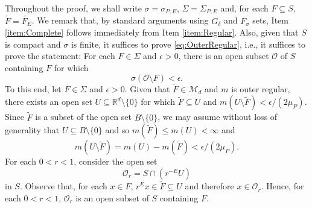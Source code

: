 \documentclass[smallextended]{svjour3}
\theoremstyle{remark}
\renewenvironment{proof}[1][\proofname]{\renewcommand\xproofname{#1}\xproof}{\endxproof}
\begin{document}
\begin{proof}
Throughout the proof, we shall write $\sigma=\sigma_{P,E}$, $\Sigma=\Sigma_{P,E}$ and, for each $F\subseteq S$, $\widetilde{F}=\widetilde{F_E}$. We remark that, by standard arguments using $G_\delta$ and $F_\sigma$ sets, Item \ref{item:Complete} follows immediately from Item \ref{item:Regular}. Also, given that $S$ is compact and $\sigma$ is finite, it suffices to prove \eqref{eq:OuterRegular}, i.e., it suffices to prove the statement: For each $F\in \Sigma$ and $\epsilon>0$, there is an open subset $\mathcal{O}$ of $S$ containing $F$ for which 
\begin{equation*}
\sigma(\mathcal{O}\setminus F)<\epsilon.
\end{equation*}
To this end, let $F\in \Sigma$ and $\epsilon>0$. Given that $\widetilde{F}\in\mathcal{M}_d$ and $m$ is outer regular, there exists an open set $U\subseteq \mathbb{R}^d\setminus\{0\}$ for which $\widetilde{F}\subseteq U$ and $m(U\setminus\widetilde{F})<\epsilon/(2\mu_P)$. Since $\widetilde{F}$ is a subset of the open set $B\setminus\{0\}$, we may assume without loss of generality that $U\subseteq B\setminus\{0\}$ and so $m(\widetilde{F})\leq m(U)<\infty$ and
\begin{equation}\label{eq:LebesgueOuter}
m(U\setminus \widetilde{F})=m(U)-m(\widetilde{F})<\epsilon/(2\mu_P).
\end{equation}
For each $0<r<1$, consider the open set
\begin{equation*}
\mathcal{O}_r=S\cap\left( r^{-E}U\right)
\end{equation*}
in $S$. Observe that, for each $x\in F$, $r^E x\in \widetilde{F}\subseteq U$ and therefore $x\in \mathcal{O}_r$. Hence, for each $0<r<1$, $\mathcal{O}_r$ is an open subset of $S$ containing $F$. 


\end{proof}
\end{document}
